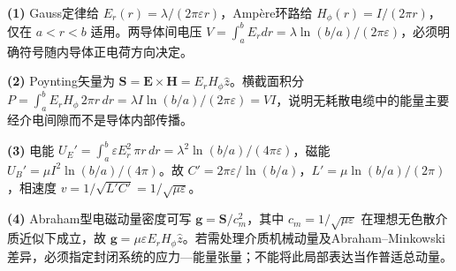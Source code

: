 \par\noindent\textbf{(1)} Gauss定律给 \(E_r(r)=\lambda/(2\pi\varepsilon r)\)，Ampère环路给 \(H_\phi(r)=I/(2\pi r)\)，仅在 \(a<r<b\) 适用。两导体间电压 \(V=\int_a^bE_rdr=\lambda\ln(b/a)/(2\pi\varepsilon)\)，必须明确符号随内导体正电荷方向决定。
\par\noindent\textbf{(2)} Poynting矢量为 \(\boldsymbol S=\boldsymbol E\times\boldsymbol H=E_rH_\phi\hat z\)。横截面积分 \(P=\int_a^bE_rH_\phi\,2\pi r\,dr=\lambda I\ln(b/a)/(2\pi\varepsilon)=VI\)，说明无耗散电缆中的能量主要经介电间隙而不是导体内部传播。
\par\noindent\textbf{(3)} 电能 \(U_E'=\int_a^b\varepsilon E_r^2\,\pi r\,dr=\lambda^2\ln(b/a)/(4\pi\varepsilon)\)，磁能 \(U_B'=\mu I^2\ln(b/a)/(4\pi)\)。故 \(C'=2\pi\varepsilon/\ln(b/a)\)，\(L'=\mu\ln(b/a)/(2\pi)\)，相速度 \(v=1/\sqrt{L'C'}=1/\sqrt{\mu\varepsilon}\)。
\par\noindent\textbf{(4)} Abraham型电磁动量密度可写 \(\boldsymbol g=\boldsymbol S/c_m^2\)，其中 \(c_m=1/\sqrt{\mu\varepsilon}\) 在理想无色散介质近似下成立，故 \(\boldsymbol g=\mu\varepsilon E_rH_\phi\hat z\)。若需处理介质机械动量及Abraham–Minkowski差异，必须指定封闭系统的应力—能量张量；不能将此局部表达当作普适总动量。
